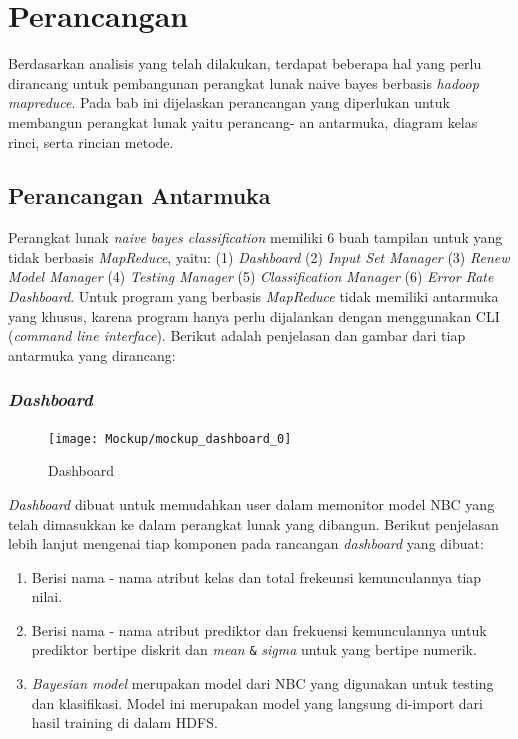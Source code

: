 \chapter{Perancangan}
Berdasarkan analisis yang telah dilakukan, terdapat beberapa hal yang perlu dirancang untuk pembangunan perangkat lunak naive bayes berbasis \textit{hadoop mapreduce}. Pada bab ini dijelaskan perancangan yang diperlukan untuk membangun perangkat lunak yaitu perancang-
an antarmuka, diagram kelas rinci, serta rincian metode.
			
\section{Perancangan Antarmuka}
\label{sec:Perancangan Antarmuka}

Perangkat lunak \textit{naive bayes classification} memiliki 6 buah tampilan untuk yang tidak berbasis \textit{MapReduce}, yaitu: (1) \textit{Dashboard} (2) \textit{Input Set Manager} (3) \textit{Renew Model Manager} (4) \textit{Testing Manager} (5) \textit{Classification Manager} (6) \textit{Error Rate Dashboard}. Untuk program yang berbasis \textit{MapReduce} tidak memiliki antarmuka yang khusus, karena program hanya perlu dijalankan dengan menggunakan CLI (\textit{command line interface}). Berikut adalah penjelasan dan gambar dari tiap antarmuka yang dirancang:

\subsection{\textit{Dashboard}}
\label{subsec:Dashboard}

\begin{figure}[H]
	\centering
	\texttt{[image: Mockup/mockup\_dashboard\_0]}
	\caption[input-set-gui-1]{Dashboard}
	\label{fig:input-set-gui-1}
\end{figure}
\textit{Dashboard} dibuat untuk memudahkan user dalam memonitor model NBC yang telah dimasukkan ke dalam perangkat lunak yang dibangun. Berikut penjelasan lebih lanjut mengenai tiap komponen pada rancangan \textit{dashboard} yang dibuat:
\begin{enumerate}
	\item Berisi nama - nama atribut kelas dan total frekeunsi kemunculannya tiap nilai.
	\item Berisi nama - nama atribut prediktor dan frekuensi kemunculannya untuk prediktor bertipe diskrit dan \textit{mean} \verb|&| \textit{sigma} untuk yang bertipe numerik.
	\item \textit{Bayesian model} merupakan model dari NBC yang digunakan untuk testing dan klasifikasi. Model ini merupakan model yang langsung di-import dari hasil training di dalam HDFS.
\end{enumerate}

